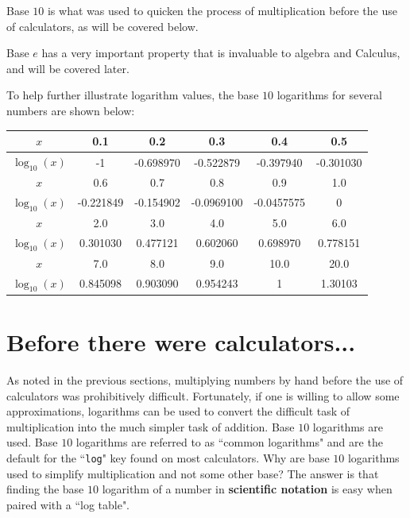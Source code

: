\documentclass{article}
\begin{document}
Base \(10\) is what was used to quicken the process of multiplication before the use of calculators, as will be covered below. 

Base \(e\) has a very important property that is invaluable to algebra and Calculus, and will be covered later.

To help further illustrate logarithm values, the base \(10\) logarithms for several numbers are shown below:

\begin{tabular}{|c||c|c|c|c|c|}
\hline
\(x\) & 0.1 & 0.2 & 0.3 & 0.4 & 0.5 \\
\hline
\(\log_{10}(x)\) & -1 & -0.698970 & -0.522879 & -0.397940 & -0.301030 \\
\hline
\hline
\(x\) & 0.6 & 0.7 & 0.8 & 0.9 & 1.0 \\
\hline
\(\log_{10}(x)\) & -0.221849 & -0.154902 & -0.0969100 & -0.0457575 & 0 \\
\hline
\hline
\(x\) & 2.0 & 3.0 & 4.0 & 5.0 & 6.0 \\
\hline
\(\log_{10}(x)\) & 0.301030 & 0.477121 & 0.602060 & 0.698970 & 0.778151 \\
\hline
\hline
\(x\) & 7.0 & 8.0 & 9.0 & 10.0 & 20.0 \\
\hline
\(\log_{10}(x)\) & 0.845098 & 0.903090 & 0.954243 & 1 & 1.30103 \\
\hline
\end{tabular}




\section*{Before there were calculators...}

As noted in the previous sections, multiplying numbers by hand before the use of calculators was prohibitively difficult. Fortunately, if one is willing to allow some approximations, logarithms can be used to convert the difficult task of multiplication into the much simpler task of addition. Base \(10\) logarithms are used. Base \(10\) logarithms are referred to as ``common logarithms" and are the default for the ``\texttt{log}" key found on most calculators. Why are base \(10\) logarithms used to simplify multiplication and not some other base? The answer is that finding the base \(10\) logarithm of a number in {\bf scientific notation} is easy when paired with a ``log table".
\end{document}
